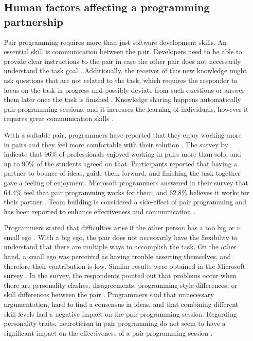 \documentclass[conference]{IEEEtran}
\begin{document}
\subsection{Human factors affecting a programming partnership}

Pair programming requires more than just software development skills. An essential skill is communication between the pair. Developers need to be able to provide clear instructions to the pair in case the other pair does not necessarily understand the task goal \cite{10.1145/2652524.2652529}. Additionally, the receiver of this new knowledge might ask questions that are not related to the task, which requires the responder to focus on the task in progress and possibly deviate from such questions or answer them later once the task is finished \cite{10.1145/2652524.2652529}. Knowledge sharing happens automatically pair programming sessions, and it increases the learning of individuals, however it requires great communication skills \cite{10.1145/2652524.2652529}. 

With a suitable pair, programmers have reported that they enjoy working more in pairs and they feel more comfortable with their solution \cite{Williams2000Strengthening}. The survey by \cite{Williams2000Strengthening} indicate that 96\% of professionals enjoyed working in pairs more than solo, and up to 90\% of the students agreed on that. Participants reported that having a partner to bounce of ideas, guide them forward, and finishing the task together gave a feeling of enjoyment. Microsoft programmers answered in their survey that 64.4\% feel that pair programming works for them, and 62.8\% believes it works for their partner \cite{10.1145/1414004.1414026}. Team building is considered a side-effect of pair programming and has been reported to enhance effectiveness and communication \cite{10.5555/377517.377531}. 

Programmers stated that difficulties arise if the other person has a too big or a small ego \cite{Williams2000Strengthening}. With a big ego, the pair does not necessarily have the flexibility to understand that there are multiple ways to accomplish the task. On the other hand, a small ego was perceived as having trouble asserting themselves, and therefore their contribution is low. Similar results were obtained in the Microsoft survey \cite{10.1145/1414004.1414026}. In the survey, the respondents pointed out that problems occur when there are personality clashes, disagreements, programming style differences, or skill differences between the pair \cite{10.1145/1414004.1414026}. Programmers said that unnecessary argumentation, hard to find a consensus in ideas, and that combining different skill levels had a negative impact on the pair programming session. Regarding personality traits, neuroticism in pair programming do not seem to have a significant impact on the effectiveness of a pair programming session \cite{10.1145/1852786.1852816}.
\end{document}

